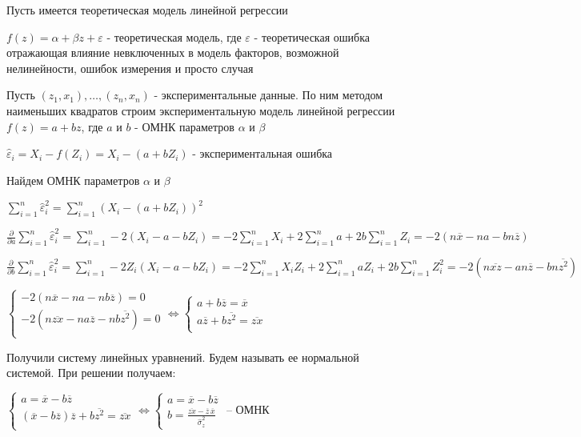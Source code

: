\documentclass[12pt]{article}
\begin{document}
Пусть имеется теоретическая модель линейной регрессии 

$f(z) = \alpha + \beta z + \varepsilon$ - теоретическая модель, где $\varepsilon$ - теоретическая ошибка
отражающая влияние невключенных в модель факторов, возможной нелинейности, ошибок измерения и просто случая

Пусть $(z_1, x_1), \dots, (z_n, x_n)$ - экспериментальные данные. По ним методом наименьших квадратов строим
экспериментальную модель линейной регрессии $f(z) = a + b z$, где $a$ и $b$ - ОМНК параметров $\alpha$ и $\beta$

$\hat \varepsilon_i = X_i - f(Z_i) = X_i - (a + b Z_i)$ - экспериментальная ошибка

Найдем ОМНК параметров $\alpha$ и $\beta$

$\sum_{i = 1}^n \hat \varepsilon_i^2 = \sum_{i = 1}^n (X_i - (a + b Z_i))^2$

$\frac{\partial}{\partial a} \sum_{i = 1}^n \hat \varepsilon_i^2 = \sum_{i = 1}^n -2 (X_i - a - b Z_i) = 
-2 \sum_{i = 1}^n X_i + 2\sum_{i = 1}^n a + 2b \sum_{i = 1}^n Z_i = -2(n \overline{x} - na - bn \overline{z})$

$\frac{\partial}{\partial b} \sum_{i = 1}^n \hat \varepsilon_i^2 = \sum_{i = 1}^n -2 Z_i (X_i - a - b Z_i) = 
-2 \sum_{i = 1}^n X_i Z_i + 2\sum_{i = 1}^n a Z_i + 2b \sum_{i = 1}^n Z_i^2 = -2(n \overline{x z} - a n \overline{z} - bn \overline{z^2})$

$\begin{cases}
    -2 (n \overline{x} - na - nb \overline{z}) = 0 \\
    -2 (n \overline{zx} - na \overline{z} - nb \overline{z^2}) = 0 \\
\end{cases} \Longleftrightarrow \begin{cases}
    a + b\overline{z} = \overline{x} \\
    a\overline{z} + b \overline{z^2} = \overline{zx} \\
\end{cases}$

Получили систему линейных уравнений. Будем называть ее нормальной системой. При решении получаем:

$\begin{cases}
    a = \overline{x} - b \overline{z} \\
    (\overline{x} - b \overline{z}) \overline{z} + b \overline{z^2} = \overline{zx} \\
\end{cases} \Longleftrightarrow \begin{cases}
    a = \overline{x} - b \overline{z} \\
    b = \frac{\overline{zx} - \overline{z} \, \overline{x}}{\hat \sigma^2_z}
\end{cases}$ -- ОМНК 
\end{document}
